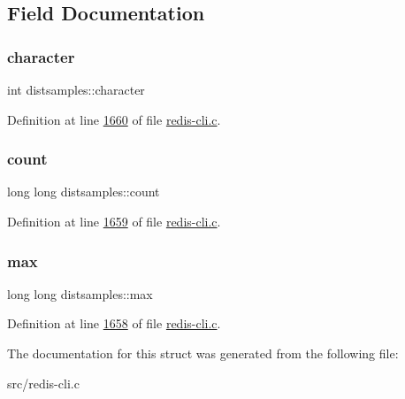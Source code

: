 \subsection{Field Documentation}
\mbox{\label{structdistsamples_a8cc486cc09fcdb634ea9480b57958ca0}} 
\subsubsection{\texorpdfstring{character}{character}}
{\footnotesize\ttfamily int distsamples\+::character}



Definition at line \hyperlink{redis-cli_8c_source_l01660}{1660} of file \hyperlink{redis-cli_8c_source}{redis-\/cli.\+c}.

\mbox{\label{structdistsamples_a7c254d479072c13b847895fbc2e16c23}} 
\subsubsection{\texorpdfstring{count}{count}}
{\footnotesize\ttfamily long long distsamples\+::count}



Definition at line \hyperlink{redis-cli_8c_source_l01659}{1659} of file \hyperlink{redis-cli_8c_source}{redis-\/cli.\+c}.

\mbox{\label{structdistsamples_a42cb229a35440667716cbe5dd5da4f0e}} 
\subsubsection{\texorpdfstring{max}{max}}
{\footnotesize\ttfamily long long distsamples\+::max}



Definition at line \hyperlink{redis-cli_8c_source_l01658}{1658} of file \hyperlink{redis-cli_8c_source}{redis-\/cli.\+c}.



The documentation for this struct was generated from the following file\+:\begin{DoxyCompactItemize}
\item 
src/redis-\/cli.\+c\end{DoxyCompactItemize}
